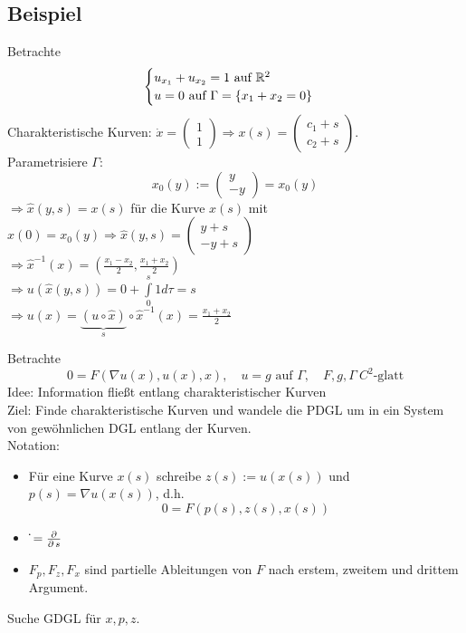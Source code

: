 \subsection{Beispiel}
\label{bsp_3}
	Betrachte \marginnote{[3]}
	\[ \begin{cases}
		u_{x_1} + u_{x_2} = 1 \text{ auf } \mathbb{R}^2 \\
		u = 0 \text{ auf } \Gamma = \{x_1 + x_2 = 0 \}
	\end{cases} \]
	Charakteristische Kurven: $\dot{x} = \begin{pmatrix} 1 \\ 1	\end{pmatrix} \Rightarrow x(s) = \begin{pmatrix} c_1 + s \\ c_2 + s \end{pmatrix}$. \\
	Parametrisiere $\Gamma$:
	\[ x_0(y) := \begin{pmatrix} y \\ -y \end{pmatrix} = x_0(y) \]
	$\Rightarrow \widehat{x}(y,s) = x(s)$ für die Kurve $x(s)$ mit $x(0) = x_0(y) \Rightarrow \widehat{x}(y,s) = \begin{pmatrix} y+s \\ -y+s \end{pmatrix}$ \\
	$\Rightarrow \widehat{x}^{-1}(x) = (\frac{x_1-x_2}{2},\frac{x_1+x_2}{2})$ \\
	$\Rightarrow u(\widehat{x}(y,s)) = 0 + \int\limits_{0}^{s} 1 d\tau = s$ \\
	$\Rightarrow u(x) = \underbrace{(u \circ \widehat{x})}_s \circ \widehat{x}^{-1}(x) = \frac{x_1+x_2}{2}$
	
	Betrachte
	\begin{equation}
		0 = F(\nabla u(x),u(x),x), \quad u=g \text{ auf } \Gamma, \quad F,g,\Gamma \ C^2\text{-glatt} \label{eq_2204_2}
	\end{equation}
	Idee: Information fließt entlang charakteristischer Kurven \\
	Ziel: Finde charakteristische Kurven und wandele die PDGL um in ein System von gewöhnlichen DGL entlang der Kurven. \\
	Notation: \begin{itemize}
	\item Für eine Kurve $x(s)$ schreibe $z(s) := u(x(s))$ und $p(s) = \nabla u(x(s))$, d.h.
	\[ 0 = F(p(s), z(s), x(s)) \]
	\item $\dot{} = \frac{\operatorname{\partial}}{\operatorname{\partial} s}$
	\item $F_p,F_z,F_x$ sind partielle Ableitungen von $F$ nach erstem, zweitem und drittem Argument.
	\end{itemize}
	Suche GDGL für $x,p,z$.
	

